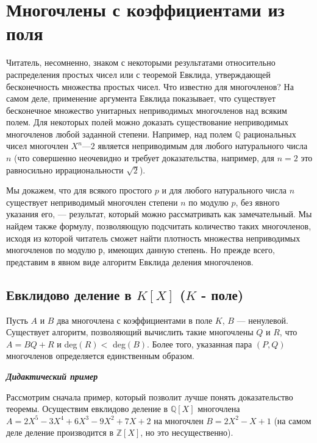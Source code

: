 \section{Многочлены с коэффициентами из поля}
Читатель, несомненно, знаком с некоторыми результатами  
относительно распределения простых чисел или с теоремой Евклида,  
утверждающей бесконечность множества простых чисел. Что известно для  
многочленов? На самом деле, применение аргумента Евклида  
показывает, что существует бесконечное множество унитарных неприводимых 
многочленов над всяким полем. Для некоторых полей можно доказать 
существование неприводимых многочленов любой заданной степени. 
Например, над полем $\mathbb{Q}$ рациональных чисел многочлен $X^n — 2$  
является неприводимым для любого натурального числа $n$ (что совершенно 
неочевидно и требует доказательства, например, для $n = 2$ это  
равносильно иррациональности $\sqrt{2}$). 

Мы докажем, что для всякого простого $p$ и для любого  
натурального числа $n$ существует неприводимый многочлен степени $n$ по модулю 
$p$, без явного указания его, — результат, который можно  
рассматривать как замечательный. Мы найдем также формулу, позволяющую 
подсчитать количество таких многочленов, исходя из которой  
читатель сможет найти плотность множества неприводимых многочленов 
по модулю р, имеющих данную степень. Но прежде всего, представим 
в явном виде алгоритм Евклида деления многочленов. 
\pagebreak

\subsection{Евклидово деление в $K[X]$ ($K$ - поле)}

\begin{thm}
\hspace*{15pt}Пусть $A$ и $B$ два многочлена с коэффициентами в поле $K$, $B$ —  
ненулевой. Существует алгоритм, позволяющий вычислить такие  
многочлены $Q$ и $R$, что $A = BQ + R $ и deg$(R) < $ deg$(B)$. Более того, указанная 
пара $(P, Q)$ многочленов определяется единственным образом.
\end{thm}

\noindent\textbf{\textit{Дидактический пример}}

Рассмотрим сначала пример, который позволит лучше понять  
доказательство теоремы. Осуществим евклидово деление в $\mathbb{Q}[X]$ многочлена\linebreak 
$A = 2X^5 - 3X^4 + 6X^3 - 9X^2 + 7X + 2$ на многочлен $B = 2X^2 - X + 1$ 
(на самом деле деление производится в $\mathbb{Z}[X]$, но это несущественно). 

